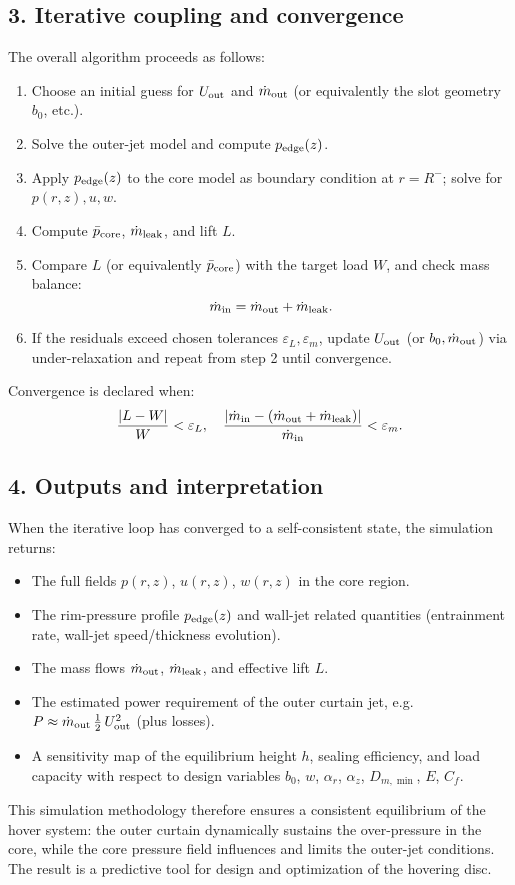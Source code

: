\documentclass[11pt,a4paper]{article}
\begin{document}
\subsection*{3. Iterative coupling and convergence}
The overall algorithm proceeds as follows:
\begin{enumerate}
  \item Choose an initial guess for \(U_{\rm out}\) and \(\dot m_{\rm out}\) (or equivalently the slot geometry \(b_0\), etc.).  
  \item Solve the outer-jet model and compute \(p_{\rm edge}(z)\).  
  \item Apply \(p_{\rm edge}(z)\) to the core model as boundary condition at \(r=R^{-}\); solve for \(p(r,z),u,w\).  
  \item Compute \(\bar p_{\rm core}\), \(\dot m_{\rm leak}\), and lift \(L\).  
  \item Compare \(L\) (or equivalently \(\bar p_{\rm core}\)) with the target load \(W\), and check mass balance:  
    \[
      \dot m_{\rm in} = \dot m_{\rm out} + \dot m_{\rm leak}.
    \]
  \item If the residuals exceed chosen tolerances \(\varepsilon_L,\varepsilon_m\), update \(U_{\rm out}\) (or \(b_0,\dot m_{\rm out}\)) via under-relaxation and repeat from step 2 until convergence.  
\end{enumerate}
Convergence is declared when:
\[
  \frac{|L - W|}{W} < \varepsilon_L,\quad
  \frac{|\dot m_{\rm in} - (\dot m_{\rm out} + \dot m_{\rm leak})|}{\dot m_{\rm in}} < \varepsilon_m.
\]

\subsection*{4. Outputs and interpretation}
When the iterative loop has converged to a self-consistent state, the simulation returns:
\begin{itemize}
  \item The full fields \(p(r,z)\), \(u(r,z)\), \(w(r,z)\) in the core region.
  \item The rim-pressure profile \(p_{\rm edge}(z)\) and wall-jet related quantities (entrainment rate, wall-jet speed/thickness evolution).
  \item The mass flows \(\dot m_{\rm out}\), \(\dot m_{\rm leak}\), and effective lift \(L\).
  \item The estimated power requirement of the outer curtain jet, e.g.\ \(P \approx \dot m_{\rm out}\,\tfrac12\,U_{\rm out}^2\) (plus losses).
  \item A sensitivity map of the equilibrium height \(h\), sealing efficiency, and load capacity with respect to design variables \(b_0\), \(w\), \(\alpha_r\), \(\alpha_z\), \(D_{m,\min}\), \(E\), \(C_f\).
\end{itemize}
This simulation methodology therefore ensures a consistent equilibrium of the hover system: the outer curtain dynamically sustains the over-pressure in the core, while the core pressure field influences and limits the outer-jet conditions. The result is a predictive tool for design and optimization of the hovering disc.
\end{document}
